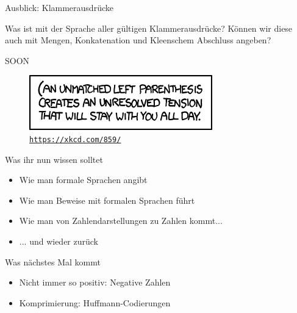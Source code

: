 

\begin{frame}{Ausblick: Klammerausdrücke}
	
	Was ist mit der Sprache aller gültigen Klammerausdrücke? Können wir diese auch mit Mengen, Konkatenation und Kleenschem Abschluss angeben? \\[1em]
	\pause
	
	\begin{block}{}
		\Large
		\centering
		SOON\\[1em]
	\end{block}

	\begin{figure}[H]
		\centering
		\includegraphics[scale=0.7]{xkcd/(.png}
		\vspace{-7pt}
		\caption{ \texttt{\url{https://xkcd.com/859/}} }
	\end{figure}
\end{frame}

%

\begin{frame}	
	\begin{block}{Was ihr nun wissen solltet}
		\begin{itemize}
			\item Wie man formale Sprachen angibt
			\item Wie man Beweise mit formalen Sprachen führt
			\item Wie man von Zahlendarstellungen zu Zahlen kommt...
			\item ... und wieder zurück
		\end{itemize}
	\end{block}
	
	\begin{block}{Was nächstes Mal kommt}
		\begin{itemize}
			\item Nicht immer so positiv: Negative Zahlen
			\item Komprimierung: Huffmann-Codierungen
		\end{itemize}
	\end{block}
\end{frame}


\slideThanks


